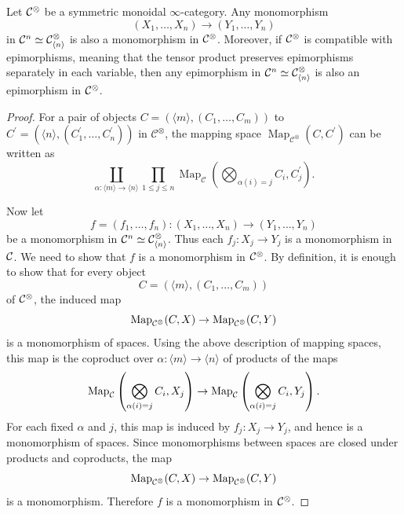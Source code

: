 \documentclass[10pt,a4paper,oneside]{article}
\begin{document}
\begin{lem}\label{monoperad}
Let $\mathcal{C}^\otimes$ be a symmetric monoidal $\infty$-category. Any monomorphism
\[
(X_1,\dots,X_n)\to (Y_1,\dots,Y_n)
\]
in $\mathcal{C}^n\simeq\mathcal{C}^{\otimes}_{\left<n \right>}$ is also a monomorphism in $\mathcal{C}^\otimes$. Moreover, if $\mathcal{C}^\otimes$ is compatible with epimorphisms, meaning that the tensor product preserves epimorphisms separately in each variable, then any epimorphism in $\mathcal{C}^n\simeq\mathcal{C}^{\otimes}_{\left<n \right>}$ is also an epimorphism in $\mathcal{C}^\otimes$.
\end{lem}

\begin{proof}
For a pair of objects $C=\left(\langle m\rangle,\left(C_1, \ldots, C_m\right)\right)$ to $C^{\prime}=\left(\langle n\rangle,\left(C_1^{\prime}, \ldots, C_n^{\prime}\right)\right)$ in $\mathcal{C}^{\otimes}$, the mapping space $\operatorname{Map}_{\mathcal{C}^{\otimes}}(C, C^{\prime})$ can be written as  
$$
\coprod_{\alpha:\langle m\rangle \rightarrow\langle n\rangle} \prod_{1 \leq j \leq n} \operatorname{Map}_{\mathcal{C}}\left(\bigotimes_{\alpha(i)=j}C_i, C_j^{\prime}\right).
$$

Now let
$$
f=(f_1,\ldots,f_n):(X_1,\ldots,X_n)\to (Y_1,\ldots,Y_n)
$$
be a monomorphism in $\mathcal{C}^n\simeq \mathcal{C}^\otimes_{\langle n\rangle}$. Thus each $f_j:X_j\to Y_j$ is a monomorphism in $\mathcal{C}$. We need to show that $f$ is a monomorphism in $\mathcal{C}^\otimes$. By definition, it is enough to show that for every object
$$
C=\left(\langle m\rangle,\left(C_1,\ldots,C_m\right)\right)
$$
of $\mathcal{C}^\otimes$, the induced map
$$
\operatorname{Map}_{\mathcal{C}^\otimes}(C,X)\to \operatorname{Map}_{\mathcal{C}^\otimes}(C,Y)
$$
is a monomorphism of spaces. Using the above description of mapping spaces, this map is the coproduct over $\alpha:\langle m\rangle\to\langle n\rangle$ of products of the maps
$$
\operatorname{Map}_{\mathcal{C}}\left(\bigotimes_{\alpha(i)=j}C_i,X_j\right)
\to
\operatorname{Map}_{\mathcal{C}}\left(\bigotimes_{\alpha(i)=j}C_i,Y_j\right).
$$
For each fixed $\alpha$ and $j$, this map is induced by $f_j:X_j\to Y_j$, and hence is a monomorphism of spaces. Since monomorphisms between spaces are closed under products and coproducts, the map
$$
\operatorname{Map}_{\mathcal{C}^\otimes}(C,X)\to \operatorname{Map}_{\mathcal{C}^\otimes}(C,Y)
$$
is a monomorphism. Therefore $f$ is a monomorphism in $\mathcal{C}^\otimes$.


\end{proof}
\end{document}
